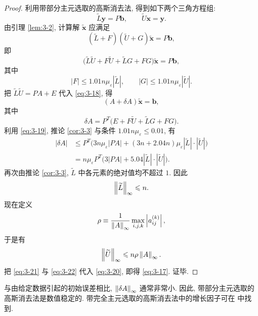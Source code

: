 \begin{proof}
利用带部分主元选取的高斯消去法, 得到如下两个三角方程组:
\[
  \widetilde{L}\mathbf{y}=P\mathbf{b},\qquad\widetilde{U}\mathbf{x}=\mathbf{y}.
\]
由引理 \ref{lem:3-2}, 计算解 $\tilde{\mathbf{x}}$ 应满足
\[
  (\widetilde{L}+F)(\widetilde{U}+G)\tilde{\mathbf{x}}=P\mathbf{b},
\]
即
\begin{equation}
  \bigl(\widetilde{L}\widetilde{U}+F\widetilde{U}+\widetilde{L}G+FG\bigr)\tilde{\mathbf{x}}=P\mathbf{b},
  \label{eq:3-18}
\end{equation}
其中
\begin{equation}
  |F|\leqslant1.01n\mu_\varepsilon|\widetilde{L}|,\qquad
  |G|\leqslant1.01n\mu_\varepsilon|\widetilde{U}|.
  \label{eq:3-19}
\end{equation}
把 $\widetilde{L}\widetilde{U}=PA+E$ 代入 \eqref{eq:3-18}, 得
\[
  (A+\delta A)\tilde{\mathbf{x}}=\mathbf{b},
\]
其中
\[
  \delta A=P^T\bigl(E+F\widetilde{U}+\widetilde{L}G+FG\bigr).
\]
利用 \eqref{eq:3-19}, 推论 \ref{cor:3-3} 与条件 $1.01n\mu_\varepsilon\leqslant0.01$, 有
\begin{equation}
  \begin{aligned}
    |\delta A|
    &\leqslant P^T\bigl(3n\mu_\varepsilon|PA|+(3n+2.04n)\mu_\varepsilon
      |\widetilde{L}|\cdot|\widetilde{U}|\bigr)\\
    &=n\mu_\varepsilon P^T\bigl(3|PA|+5.04|\widetilde{L}|\cdot|\widetilde{U}|\bigr).
  \end{aligned}
  \label{eq:3-20}
\end{equation}
再次由推论 \ref{cor:3-3}, $\widetilde{L}$ 中各元素的绝对值均不超过 $1$. 因此
\begin{equation}
  \left\|\widetilde{L}\right\|_\infty\leqslant n.
  \label{eq:3-21}
\end{equation}
现在定义
\[
  \rho\equiv\frac{1}{\left\|A\right\|_\infty}\max_{i,j,k}\left|a_{ij}^{(k)}\right|,
\]
于是有
\begin{equation}
  \left\|\widetilde{U}\right\|_\infty\leqslant n\rho\left\|A\right\|_\infty.
  \label{eq:3-22}
\end{equation}
把 \eqref{eq:3-21} 与 \eqref{eq:3-22} 代入 \eqref{eq:3-20}, 即得 \eqref{eq:3-17}. 证毕.
\end{proof}

\begin{mremark}
与由给定数据引起的初始误差相比, $\left\|\delta A\right\|_\infty$ 通常非常小. 因此, 带部分主元选取的高斯消去法是数值稳定的. 带完全主元选取的高斯消去法中的增长因子可在 \cite{src:33,src:38} 中找到.
\end{mremark}

